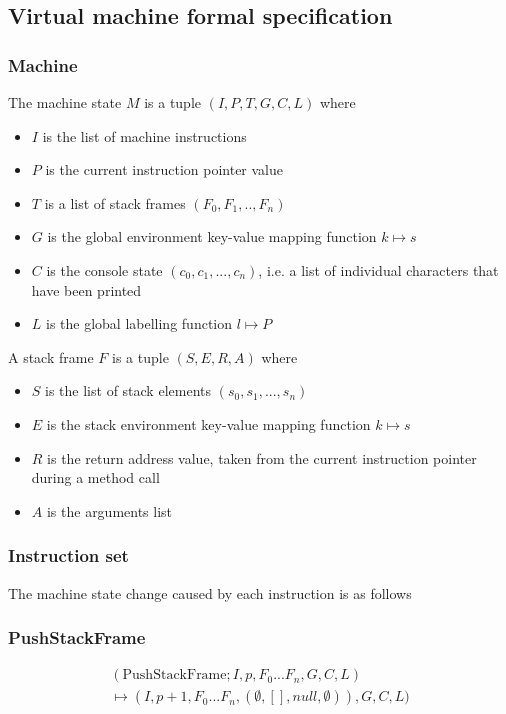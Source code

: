 \subsection{Virtual machine formal specification}

\subsubsection{Machine}

The machine state $M$ is a tuple $(I, P, T, G, C, L)$ where
\begin{itemize}
\item $I$ is the list of machine instructions
\item $P$ is the current instruction pointer value
\item $T$ is a list of stack frames $(F_0, F_1, .., F_n)$
\item $G$ is the global environment key-value mapping function $k \mapsto s$
\item $C$ is the console state $(c_0, c_1, ..., c_n)$, i.e. a list of individual characters that have been printed
\item $L$ is the global labelling function $l \mapsto P$
\end{itemize}

A stack frame $F$ is a tuple $(S, E, R, A)$ where
\begin{itemize}
\item $S$ is the list of stack elements $(s_0, s_1, ..., s_n)$
\item $E$ is the stack environment key-value mapping function $k \mapsto s$
\item $R$ is the return address value, taken from the current instruction pointer during a method call
\item $A$ is the arguments list
\end{itemize}

\subsubsection{Instruction set}

The machine state change caused by each instruction is as follows

\subsubsection{PushStackFrame}

\begin{multline}
(\text{PushStackFrame}; I, p, F_0...F_n, G, C, L) \\ \mapsto (I, p+1, F_0...F_n, (\emptyset, [], null, \emptyset)), G, C, L)
\end{multline}

